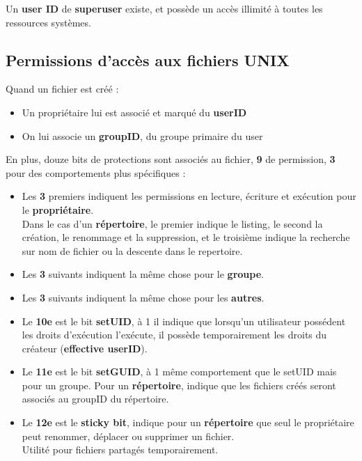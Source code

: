 \documentclass{report}
\begin{document}
			Un \textbf{user ID} de \textbf{superuser} existe, et possède un accès illimité à toutes les ressources systèmes.\\

		\subsection{Permissions d'accès aux fichiers UNIX}

			Quand un fichier est créé : \\

			\begin{itemize}
				\item Un propriétaire lui est associé et marqué du \textbf{userID}
				\item On lui associe un \textbf{groupID}, du groupe primaire du user\\
			\end{itemize}

			En plus, douze bits de protections sont associés au fichier, \textbf{9} de permission, \textbf{3} pour des comportements plus spécifiques : \\

			\begin{itemize}
				\item Les \textbf{3} premiers indiquent les permissions en lecture, écriture et exécution pour le \textbf{propriétaire}.\\
				Dans le cas d'un \textbf{répertoire}, le premier indique le listing, le second la création, le renommage et la suppression, et le troisième indique la recherche sur nom de fichier ou la descente dans le repertoire.\\
				\item Les \textbf{3} suivants indiquent la même chose pour le \textbf{groupe}.
				\item Les \textbf{3} suivants indiquent la même chose pour les \textbf{autres}.
				\item Le \textbf{10e} est le bit \textbf{setUID}, à 1 il indique que lorsqu'un utilisateur possédent les droits d'exécution l'exécute, il possède temporairement les droits du créateur (\textbf{effective userID}).
				\item Le \textbf{11e} est le bit \textbf{setGUID}, à 1 même comportement que le setUID mais pour un groupe. Pour un \textbf{répertoire}, indique que les fichiers créés seront associés au groupID du répertoire.
				\item Le \textbf{12e} est le \textbf{sticky bit}, indique pour un \textbf{répertoire} que seul le propriétaire peut renommer, déplacer ou supprimer un fichier.\\
				Utilité pour fichiers partagés temporairement.\\	
			\end{itemize}
\end{document}
